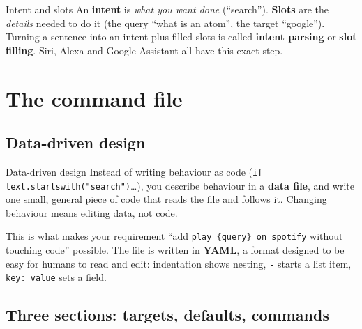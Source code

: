 \documentclass[11pt,a4paper]{article}
\begin{document}
\begin{concept}{Intent and slots}
An \textbf{intent} is \emph{what you want done} (``search''). \textbf{Slots} are the
\emph{details} needed to do it (the query ``what is an atom'', the target ``google'').
Turning a sentence into an intent plus filled slots is called \textbf{intent parsing} or
\textbf{slot filling}. Siri, Alexa and Google Assistant all have this exact step.
\end{concept}

\section{The command file}

\subsection{Data-driven design}
\begin{concept}{Data-driven design}
Instead of writing behaviour as code (\texttt{if text.startswith("search")}\ldots), you
describe behaviour in a \textbf{data file}, and write one small, general piece of code that
reads the file and follows it. Changing behaviour means editing data, not code.
\end{concept}

This is what makes your requirement ``add \texttt{play \{query\} on spotify} without touching
code'' possible. The file is written in \textbf{YAML}, a format designed to be easy for humans to
read and edit: indentation shows nesting, \texttt{-} starts a list item, \texttt{key: value} sets
a field.

\subsection{Three sections: targets, defaults, commands}
\end{document}
